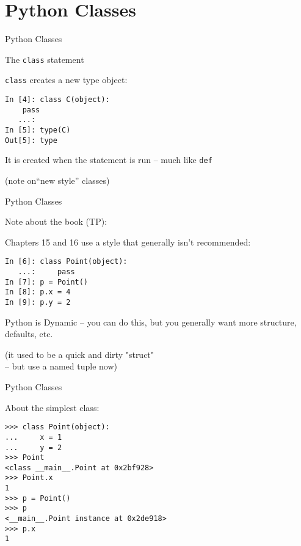 \documentclass{beamer}
\begin{document}
\section{Python Classes}

\begin{frame}[fragile]{Python Classes}

{\Large The \verb|class| statement}

\vfill
{\large \verb|class| creates a new type object:}

\begin{verbatim}
In [4]: class C(object):
    pass
   ...: 
In [5]: type(C)
Out[5]: type
\end{verbatim}

{\large It is created when the statement is run -- much like \verb|def|}

\vfill
(note on``new style'' classes)

\end{frame} 

\begin{frame}[fragile]{Python Classes}

{\Large Note about the book (TP):}

Chapters 15 and 16 use a style that generally isn't recommended:

\begin{verbatim}
In [6]: class Point(object):
   ...:     pass
In [7]: p = Point()
In [8]: p.x = 4
In [9]: p.y = 2
\end{verbatim}

Python is Dynamic -- you can do this, but you generally want more structure,
defaults, etc. 

\vfill
(it used to be a quick and dirty "struct"\\
\hspace{0.2in} -- but use a named tuple now)
\end{frame} 

\begin{frame}[fragile]{Python Classes}

{\Large About the simplest class:}

\begin{verbatim}
>>> class Point(object):
...     x = 1
...     y = 2
>>> Point
<class __main__.Point at 0x2bf928>
>>> Point.x
1
>>> p = Point()
>>> p
<__main__.Point instance at 0x2de918>
>>> p.x
1
\end{verbatim}
\end{frame} 
\end{document}
